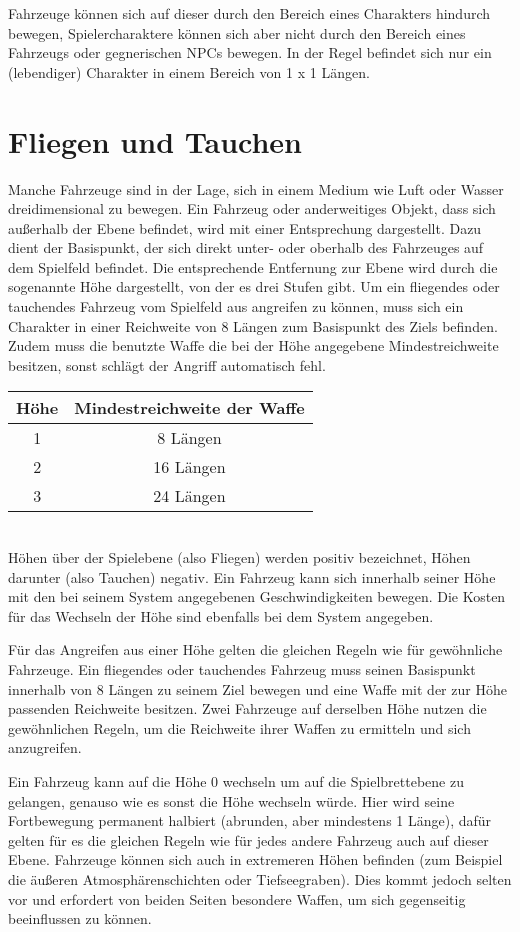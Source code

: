Fahrzeuge können sich auf dieser durch den Bereich eines Charakters hindurch bewegen, Spielercharaktere können sich aber nicht durch den Bereich eines Fahrzeugs oder gegnerischen NPCs bewegen. In der Regel befindet sich nur ein (lebendiger) Charakter in einem Bereich von 1 x 1 Längen.
\section{Fliegen und Tauchen}
\label{sec:fliegenundtauchen}
Manche Fahrzeuge sind in der Lage, sich in einem Medium wie Luft oder Wasser dreidimensional zu bewegen. Ein Fahrzeug oder anderweitiges Objekt, dass sich außerhalb der \glqq Ebene\grqq{} befindet, wird mit einer Entsprechung dargestellt. Dazu dient der Basispunkt, der sich direkt unter- oder oberhalb des Fahrzeuges auf dem \glqq Spielfeld\grqq{} befindet. Die entsprechende Entfernung zur Ebene wird durch die sogenannte \glqq Höhe\grqq{} dargestellt, von der es drei Stufen gibt. Um ein fliegendes oder tauchendes Fahrzeug vom \glqq Spielfeld\grqq{} aus angreifen zu können, muss sich ein Charakter in einer Reichweite von 8 Längen zum Basispunkt des Ziels befinden. Zudem muss die benutzte Waffe die bei der Höhe angegebene Mindestreichweite besitzen, sonst schlägt der Angriff automatisch fehl.
\\
\begin{tabular}{c|c}
Höhe & Mindestreichweite der Waffe \\
\hline
1 & 8 Längen \\
2 & 16 Längen \\
3 & 24 Längen \\
\end{tabular}
\\
Höhen über der \glqq Spielebene\grqq{} (also Fliegen) werden positiv bezeichnet, Höhen darunter (also Tauchen) negativ. Ein Fahrzeug kann sich innerhalb seiner Höhe mit den bei seinem System angegebenen Geschwindigkeiten bewegen. Die Kosten für das Wechseln der Höhe sind ebenfalls bei dem System angegeben.

Für das Angreifen aus einer Höhe gelten die gleichen Regeln wie für gewöhnliche Fahrzeuge. Ein fliegendes oder tauchendes Fahrzeug muss seinen Basispunkt innerhalb von 8 Längen zu seinem Ziel bewegen und eine Waffe mit der zur Höhe passenden Reichweite besitzen. Zwei Fahrzeuge auf derselben Höhe nutzen die gewöhnlichen Regeln, um die Reichweite ihrer Waffen zu ermitteln und sich anzugreifen.

Ein Fahrzeug kann auf die \glqq Höhe 0\grqq{} wechseln um auf die \glqq Spielbrettebene\grqq{} zu gelangen, genauso wie es sonst die Höhe wechseln würde. Hier wird seine Fortbewegung permanent halbiert (abrunden, aber mindestens 1 Länge), dafür gelten für es die gleichen Regeln wie für jedes andere Fahrzeug auch auf dieser Ebene. Fahrzeuge können sich auch in extremeren Höhen befinden (zum Beispiel die äußeren Atmosphärenschichten oder Tiefseegraben). Dies kommt jedoch selten vor und erfordert von beiden Seiten besondere Waffen, um sich gegenseitig beeinflussen zu können.


